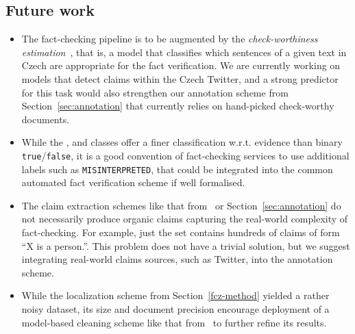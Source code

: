 \subsection{Future work}
\begin{itemize}
    \item The fact-checking pipeline is to be augmented by the \textit{check-worthiness estimation}~\cite{nakov2021automated}, that is, a model that classifies which sentences of a given text in Czech are appropriate for the fact verification.
    We are currently working on models that detect claims within the Czech Twitter, and a strong predictor for this task would also strengthen our annotation scheme from Section~\ref{sec:annotation} that currently relies on hand-picked check-worthy documents.
    \item While the \SUP, \REF{} and \NEI{} classes  offer a finer classification w.r.t. evidence than binary \texttt{true}/\texttt{false}, it is a good convention of fact-checking services to use additional labels such as \texttt{MISINTERPRETED}, that could be integrated into the common automated fact verification scheme if well formalised.
    \item The claim extraction schemes like that from~\cite{fever2018} or Section~\ref{sec:annotation} do not necessarily produce organic claims capturing the real-world complexity of fact-checking.
    For example, just the \FEN \train set contains hundreds of claims of form \enquote{X is a person.}.
    This problem does not have a trivial solution, but we suggest integrating real-world claims sources, such as Twitter, into the annotation scheme.
    \item While the \FEVER localization scheme from Section~\ref{fcz-method} yielded a rather noisy dataset, its size and document precision encourage
    deployment of a model-based cleaning scheme like that from~\cite{Jeatrakul} to further refine its results.
\end{itemize}